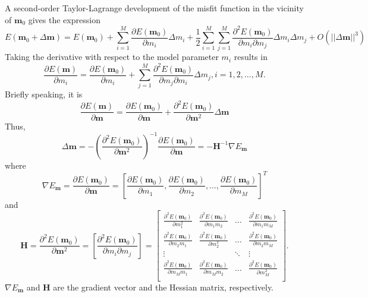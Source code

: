 A second-order Taylor-Lagrange development of the misfit function in the vicinity of $\textbf{m}_0$ gives the expression
\begin{equation}
E(\textbf{m}_0+\Delta \textbf{m})=E(\textbf{m}_0)
+\sum_{i=1}^M\frac{\partial E(\textbf{m}_0)}{\partial m_i}\Delta m_i
+\frac{1}{2}\sum_{i=1}^M\sum_{j=1}^M \frac{\partial^2 E(\textbf{m}_0)}{\partial m_i \partial m_j}\Delta m_i \Delta m_j+O(||\Delta\textbf{m}||^3)
\end{equation}
Taking the derivative with respect to the model parameter $m_i$ results in
\begin{equation}
\frac{\partial E(\textbf{m})}{\partial m_i}=\frac{\partial E(\textbf{m}_0)}{\partial m_i}+\sum_{j=1}^M \frac{\partial^2 E(\textbf{m}_0)}{\partial m_j \partial m_i}\Delta m_j,
i=1,2,\ldots,M.
\end{equation}
Briefly speaking, it is
\begin{equation}
\frac{\partial E(\textbf{m})}{\partial \textbf{m}}=\frac{\partial E(\textbf{m}_0)}{\partial \textbf{m}}+\frac{\partial^2 E(\textbf{m}_0)}{\partial\textbf{m}^2}\Delta \textbf{m}
\end{equation}
Thus,
\begin{equation}\label{eq:deltam}
\Delta \textbf{m}=-\left(\frac{\partial^2 E(\textbf{m}_0)}{\partial\textbf{m}^2}\right)^{-1}\frac{\partial E(\textbf{m}_0)}{\partial \textbf{m}}=-\textbf{H}^{-1}\nabla E_{\textbf{m}}
\end{equation}
where
\begin{equation}
\nabla E_{\textbf{m}}=\frac{\partial E(\textbf{m}_0)}{\partial \textbf{m}}=\left[
\frac{\partial E(\textbf{m}_0)}{\partial m_1},
\frac{\partial E(\textbf{m}_0)}{\partial m_2},
\ldots,
\frac{\partial E(\textbf{m}_0)}{\partial m_M}\right]^T
\end{equation}
and
\begin{equation}
\textbf{H}=\frac{\partial^2 E(\textbf{m}_0)}{\partial\textbf{m}^2}
=\left[\frac{\partial^2 E(\textbf{m}_0)}{\partial m_i\partial m_j}\right]
=\begin{bmatrix}
\frac{\partial^2 E(\textbf{m}_0)}{\partial m_1^2}& \frac{\partial^2 E(\textbf{m}_0)}{\partial m_1 m_2}&\ldots&\frac{\partial^2 E(\textbf{m}_0)}{\partial m_1 m_M}\\
\frac{\partial^2 E(\textbf{m}_0)}{\partial m_2 m_1}& \frac{\partial^2 E(\textbf{m}_0)}{\partial m_2^2}&\ldots&\frac{\partial^2 E(\textbf{m}_0)}{\partial m_2 m_M}\\
\vdots & & \ddots &\vdots\\
\frac{\partial^2 E(\textbf{m}_0)}{\partial m_M m_1}& \frac{\partial^2 E(\textbf{m}_0)}{\partial m_M m_2}&\ldots&\frac{\partial^2 E(\textbf{m}_0)}{\partial m_M^2}\\
\end{bmatrix}.
\end{equation}
$\nabla E_{\textbf{m}}$ and $\textbf{H}$ are the gradient vector and the Hessian matrix, respectively.



